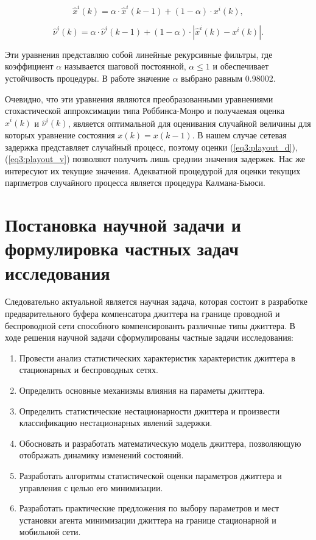 \begin{equation}\label{eq3:playout_d}
\hat{x}^{i}(k)=\alpha\cdot\hat{x}^{i}(k-1)+(1-\alpha)\cdot x^{i}(k),
\end{equation}

\begin{equation}\label{eq3:playout_v}
\hat{\nu}^{i}(k)=\alpha\cdot\hat{\nu}^{i}(k-1)+(1-\alpha)\cdot | \hat{x}^{i}(k)-x^{i}(k) |.
\end{equation}

Эти уравнения представляю собой линейные рекурсивные фильтры, где коэффициент $\alpha$ называется шаговой постоянной, $\alpha\leq1$ и обеспечивает устойчивость процедуры. В работе \cite{Ramjee} значение $\alpha$ выбрано равным 0.98002. 

Очевидно, что эти уравнения являются преобразованными уравнениями стохастической аппроксимации типа Роббинса-Монро и получаемая оценка $\hat{x}^{i}(k)$ и $\hat{\nu}^{i}(k)$, является оптимальной для оценивания случайной величины для которых уравнение состояния $x(k)=x(k-1)$. 
В нашем случае сетевая задержка представляет случайный процесс, поэтому оценки (\ref{eq3:playout_d}), (\ref{eq3:playout_v}) позволяют получить лишь среднии значения задержек. 
Нас же интересуют их текущие значения. Адекватной процедурой для оценки текущих парпметров случайного процесса является процедура Калмана-Бьюси.




\section{Постановка научной задачи и формулировка частных задач исследования } \label{sect1_tasks}

Следовательно актуальной является научная задача, которая состоит в разработке предварительного буфера компенсатора джиттера на границе проводной и беспроводной сети способного компенсированть различные типы джиттера.
В ходе решения научной задачи сформулированы частные задачи исследования:
\begin{enumerate}
  \item Провести анализ статистических характеристик характеристик джиттера в стационарных и беспроводных сетях.
  \item Определить основные механизмы влияния на параметы джиттера.
  \item Определить статистические нестационарности джиттера и произвести классификацию нестационарных явлений задержки.
  \item Обосновать и разработать математическую модель джиттера, позволяющую отображать динамику изменений состояний.
  \item Разработать алгоритмы статистической оценки параметров джиттера и управления с целью его минимизации.
  \item Разработать практические предложения по выбору параметров и мест установки агента минимизации джиттера на границе стационарной и мобильной сети.
\end{enumerate}


